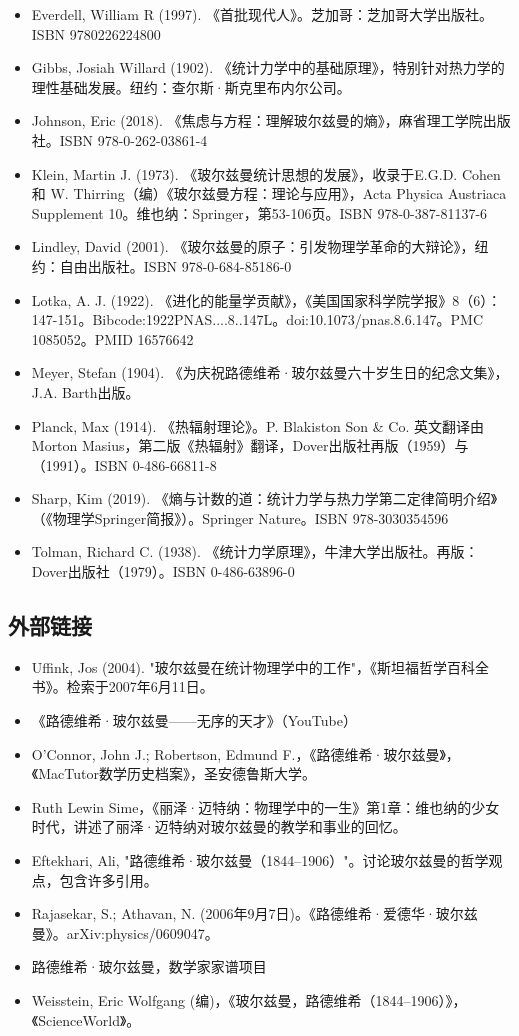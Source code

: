 \begin{itemize}
\item Everdell, William R (1997). 《首批现代人》。芝加哥：芝加哥大学出版社。ISBN 9780226224800
\item Gibbs, Josiah Willard (1902). 《统计力学中的基础原理》，特别针对热力学的理性基础发展。纽约：查尔斯·斯克里布内尔公司。
\item Johnson, Eric (2018). 《焦虑与方程：理解玻尔兹曼的熵》，麻省理工学院出版社。ISBN 978-0-262-03861-4
\item Klein, Martin J. (1973). 《玻尔兹曼统计思想的发展》，收录于E.G.D. Cohen 和 W. Thirring（编）《玻尔兹曼方程：理论与应用》，Acta Physica Austriaca Supplement 10。维也纳：Springer，第53-106页。ISBN 978-0-387-81137-6
\item Lindley, David (2001). 《玻尔兹曼的原子：引发物理学革命的大辩论》，纽约：自由出版社。ISBN 978-0-684-85186-0
\item Lotka, A. J. (1922). 《进化的能量学贡献》，《美国国家科学院学报》8（6）：147-151。Bibcode:1922PNAS....8..147L。doi:10.1073/pnas.8.6.147。PMC 1085052。PMID 16576642
\item Meyer, Stefan (1904). 《为庆祝路德维希·玻尔兹曼六十岁生日的纪念文集》，J.A. Barth出版。
\item Planck, Max (1914). 《热辐射理论》。P. Blakiston Son & Co. 英文翻译由Morton Masius，第二版《热辐射》翻译，Dover出版社再版（1959）与（1991）。ISBN 0-486-66811-8
\item Sharp, Kim (2019). 《熵与计数的道：统计力学与热力学第二定律简明介绍》（《物理学Springer简报》）。Springer Nature。ISBN 978-3030354596
\item Tolman, Richard C. (1938). 《统计力学原理》，牛津大学出版社。再版：Dover出版社（1979）。ISBN 0-486-63896-0
\end{itemize}
\subsection{外部链接}
\begin{itemize}
\item Uffink, Jos (2004). "玻尔兹曼在统计物理学中的工作"，《斯坦福哲学百科全书》。检索于2007年6月11日。
\item 《路德维希·玻尔兹曼——无序的天才》（YouTube）
\item O'Connor, John J.; Robertson, Edmund F.，《路德维希·玻尔兹曼》，《MacTutor数学历史档案》，圣安德鲁斯大学。
\item Ruth Lewin Sime，《丽泽·迈特纳：物理学中的一生》第1章：维也纳的少女时代，讲述了丽泽·迈特纳对玻尔兹曼的教学和事业的回忆。
\item Eftekhari, Ali, "路德维希·玻尔兹曼（1844–1906）"。讨论玻尔兹曼的哲学观点，包含许多引用。
\item Rajasekar, S.; Athavan, N. (2006年9月7日)。《路德维希·爱德华·玻尔兹曼》。arXiv:physics/0609047。
\item 路德维希·玻尔兹曼，数学家家谱项目
\item Weisstein, Eric Wolfgang (编)，《玻尔兹曼，路德维希（1844–1906）》，《ScienceWorld》。
\end{itemize}